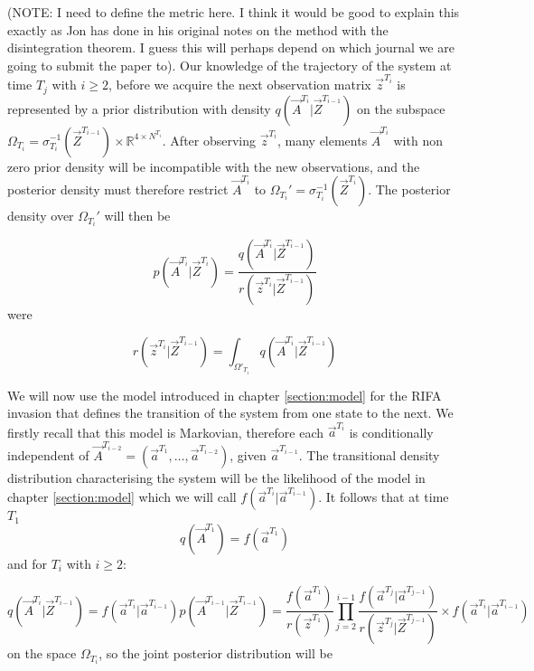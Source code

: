 {(NOTE: I need to define the metric here. I think it would be good to explain this exactly as Jon has done in his original notes on the method with the disintegration theorem. I guess this will perhaps depend on which journal we are going to submit the paper to).
Our knowledge of the trajectory of the system at time $T_j$ with $i \geq 2$, before we acquire the next observation matrix $\vec{z}^{T_i}$ is represented by a prior distribution with density $q(\vec{A}^{T_i} | \vec{Z}^{T_{i-1}})$ on the subspace $\Omega_{T_i} = \sigma_{T_i}^{-1} (\vec{Z}^{T_{i-1}}) \times \mathbb{R}^{4 \times N^{T_i}}$. After observing $\vec{z}^{T_i}$, many elements $\vec{A}^{T_i}$ with non zero prior density will be incompatible with the new observations, and the posterior density must therefore restrict $\vec{A}^{T_i}$ to $\Omega_{T_i}' = \sigma_{T_i}^{-1}(\vec{Z}^{T_i})$. The posterior density over $\Omega_{T_i}'$ will then be

\begin{equation*}
    p(\vec{A}^{T_i} | \vec{Z}^{T_i}) = \frac{q(\vec{A}^{T_i} | \vec{Z}^{T_{i-1}})}{r(\vec{z}^{T_i} | \vec{Z}^{T_{i-1}})}
\end{equation*}
were

\begin{equation*}
    r(\vec{z}^{T_i} | \vec{Z}^{T_{i-1}}) = \int_{\Omega'_{T_i}} q(\vec{A}^{T_i} | \vec{Z}^{T_{i-1}})
\end{equation*}

We will now use the model introduced in chapter \ref{section:model} for the RIFA invasion that defines the transition of the system from one state to the next. We firstly recall that this model is Markovian, therefore each $\vec{a}^{T_i}$ is conditionally independent of $\vec{A}^{T_{i-2}} = (\vec{a}^{T_1}, \dots, \vec{a}^{T_{i-2}})$, given $\vec{a}^{T_{i-1}}$. The transitional density distribution characterising the system will be the likelihood of the model in chapter \ref{section:model} which we will call $f(\vec{a}^{T_i} | \vec{a}^{T_{i-1}})$. It follows that at time $T_1$
\begin{equation*}
    q(\vec{A}^{T_1}) = f(\vec{a}^{T_1})
\end{equation*}
and for $T_i$ with $i \geq 2$:

\begin{equation*}
    q(\vec{A}^{T_i} | \vec{Z}^{T_{i-1}}) = f(\vec{a}^{T_i} | \vec{a}^{T_{i-1}}) p(\vec{A}^{T_{i-1}} | \vec{Z}^{T_{i-1}}) = \frac{f(\vec{a}^{T_1})}{r(\vec{z}^{T_1})} \prod_{j=2}^{i-1} \frac{f(\vec{a}^{T_j} | \vec{a}^{T_{j-1}})}{r(\vec{z}^{T_j} | \vec{Z}^{T_{j-1}})} \times f(\vec{a}^{T_i} | \vec{a}^{T_{i-1}})
\end{equation*}
on the space $\Omega_{T_i}$, so the joint posterior distribution will be

}
